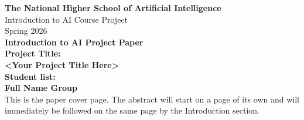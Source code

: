\thispagestyle{empty}
\begin{center}
    \vspace*{2cm}
    {\Large \textbf{The National Higher School of Artificial Intelligence}}\\[1em]
    {\large Introduction to AI Course Project}\\[1em]
    {\large Spring 2026}\\[2em]
    {\LARGE \textbf{Introduction to AI Project Paper}}\\[3em]
    {\large \textbf{Project Title:}}\\[0.5em]
    \textbf{<Your Project Title Here>}\\[2em]
    {\large \textbf{Student list:}}\\[0.5em]
    \textbf{Full Name \quad Group}\\[4em]
    \vfill
    {\small This is the paper cover page. The abstract will start on a page of its own and
    will immediately be followed on the same page by the Introduction section.}
\end{center}
\newpage
